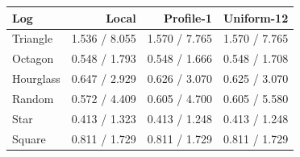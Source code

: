 \begin{tabular}{lrrr}
\toprule
Log&Local&Profile-1&Uniform-12\\
\midrule
Triangle&1.536 / 8.055&1.570 / 7.765&1.570 / 7.765\\
Octagon&0.548 / 1.793&0.548 / 1.666&0.548 / 1.708\\
Hourglass&0.647 / 2.929&0.626 / 3.070&0.625 / 3.070\\
Random&0.572 / 4.409&0.605 / 4.700&0.605 / 5.580\\
Star&0.413 / 1.323&0.413 / 1.248&0.413 / 1.248\\
Square&0.811 / 1.729&0.811 / 1.729&0.811 / 1.729\\
\bottomrule
\end{tabular}

